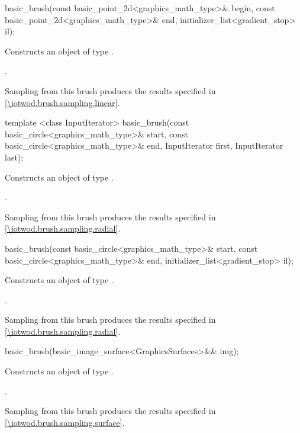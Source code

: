 %
\begin{itemdecl}
basic_brush(const basic_point_2d<graphics_math_type>& begin,
  const basic_point_2d<graphics_math_type>& end,
  initializer_list<gradient_stop> il);
\end{itemdecl}
\begin{itemdescr}
\pnum
\effects
Constructs an object of type .

\pnum
\postconditions
{}.

\pnum
\remarks
Sampling from this brush produces the results specified in \ref{\iotwod.brush.sampling.linear}.
\end{itemdescr}

%
\begin{itemdecl}
template <class InputIterator>
basic_brush(const basic_circle<graphics_math_type>& start,
  const basic_circle<graphics_math_type>& end,
  InputIterator first, InputIterator last);
\end{itemdecl}
\begin{itemdescr}
\pnum
\effects
Constructs an object of type .

\pnum
\postconditions
{}.

\pnum
\remarks
Sampling from this brush produces the results specified in \ref{\iotwod.brush.sampling.radial}.
\end{itemdescr}

%
\begin{itemdecl}
basic_brush(const basic_circle<graphics_math_type>& start,
  const basic_circle<graphics_math_type>& end,
  initializer_list<gradient_stop> il);
\end{itemdecl}
\begin{itemdescr}
\pnum
\effects
Constructs an object of type .

\pnum
\postconditions
{}.

\pnum
\remarks
Sampling from this brush produces the results specified in \ref{\iotwod.brush.sampling.radial}.
\end{itemdescr}

%
\begin{itemdecl}
basic_brush(basic_image_surface<GraphicsSurfaces>&& img);
\end{itemdecl}
\begin{itemdescr}
\pnum
\effects
Constructs an object of type .

\pnum
\postconditions
{}.

\pnum
Sampling from this brush produces the results specified in \ref{\iotwod.brush.sampling.surface}.
\end{itemdescr}


